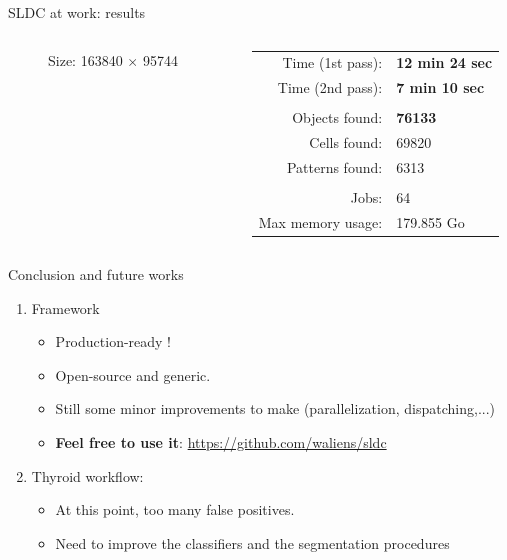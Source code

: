 \documentclass{beamer}
\begin{document}
\begin{frame}{SLDC at work: results}
\begin{columns}
\begin{column}{0.40\linewidth}
\begin{figure}
				\caption{Size: 163840 $\times$ 95744}
			\end{figure}
		\end{column}
		\begin{column}{0.47\linewidth}
		\begin{tabular}{rl}
				Time (1st pass): & \textbf{12 min 24 sec} \\
				Time (2nd pass): & \textbf{7 min 10 sec}  \\
				& \\
				Objects found: & \textbf{76133} \\
				Cells found: & 69820 \\
				Patterns found: & 6313 \\
				& \\
				Jobs: & 64 \\
				Max memory usage: & 179.855 Go \\
			\end{tabular}
		\end{column}
	\end{columns}
	
\end{frame}


\begin{frame}{Conclusion and future works}

	\begin{enumerate}
		\item Framework

		\begin{itemize}
			\item Production-ready !
			\item Open-source and generic.
			\item Still some minor improvements to make (parallelization, dispatching,...)
			\item \textbf{Feel free to use it}: {\small\url{https://github.com/waliens/sldc}}
		\end{itemize}
		
		\item Thyroid workflow:
		
		\begin{itemize}
			\item At this point, too many false positives.
			\item Need to improve the classifiers and the segmentation procedures
		\end{itemize}			
	\end{enumerate}

\end{frame}
\end{document}
